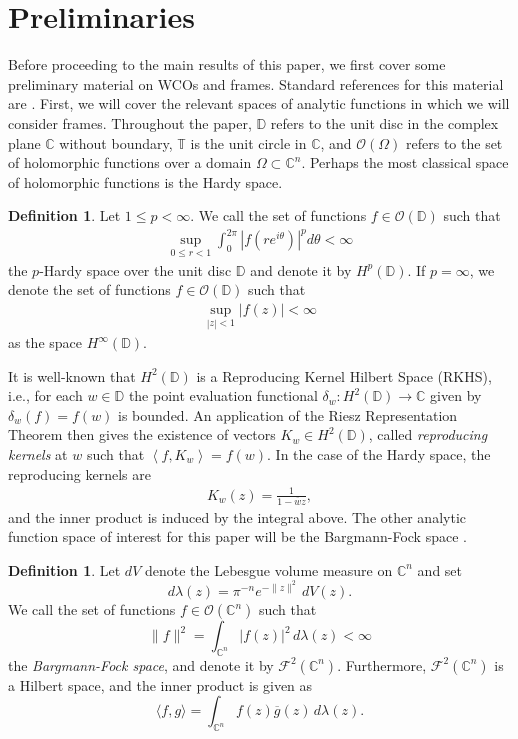 \documentclass{amsart}
\theoremstyle{definition}
\newtheorem{definition}[thm]{Definition}
\theoremstyle{remark}
\numberwithin{equation}{section}
\newcommand{\ip}[2]{\left\langle {#1} , {#2} \right\rangle} %
\begin{document}
\section{Preliminaries}\label{sec:prelim}
Before proceeding to the main results of this paper, we first cover some preliminary material on WCOs and frames. Standard references for this material are \cite{christensen2003introduction,cowen2019composition,shapiro2012composition}. First, we will cover the relevant spaces of analytic functions in which we will consider frames. Throughout the paper, $\mathbb{D}$ refers to the unit disc in the complex plane $\mathbb{C}$ without boundary, $\mathbb{T}$ is the unit circle in $\mathbb{C}$, and $\mathcal{O}(\Omega)$ refers to the set of holomorphic functions over a domain $\Omega\subset\mathbb{C}^{n}$. Perhaps the most classical space of holomorphic functions is the Hardy space.
\begin{definition}\label{def:Hardy}
    Let $1\leq p<\infty$. We call the set of functions $f\in\mathcal{O}(\mathbb{D})$ such that 
    \begin{align*}
        \sup_{0\leq r<1}\int_{0}^{2\pi}\left|f(re^{i\theta})\right|^{p}d\theta<\infty
    \end{align*}
    the $p$-Hardy space over the unit disc $\mathbb{D}$ and denote it by $H^{p}(\mathbb{D})$. If $p=\infty$, we denote the set of functions $f\in\mathcal{O}(\mathbb{D})$ such that 
    \begin{align*}
        \sup_{|z|<1}|f(z)|<\infty
    \end{align*}
    as the space $H^{\infty}(\mathbb{D})$. 
\end{definition}
It is well-known \cite{duren1970theory,paulsen2016introduction} that $H^{2}(\mathbb{D})$ is a Reproducing Kernel Hilbert Space (RKHS), i.e., for each $w\in\mathbb{D}$ the point evaluation functional $\delta_{w}:H^{2}(\mathbb{D})\to\mathbb{C}$ given by $\delta_w(f) = f(w)$ is bounded. An application of the Riesz Representation Theorem \cite{lax2014functional} then gives the existence of vectors $K_{w}\in H^{2}(\mathbb{D})$, called \textit{reproducing kernels} at $w$ such that $\ip{f}{K_{w}}=f(w)$. In the case of the Hardy space, the reproducing kernels are 
\begin{align*}
    K_{w}(z)=\frac{1}{1-\overline{w}z},
\end{align*}
and the inner product is induced by the integral above. The other analytic function space of interest for this paper will be the Bargmann-Fock space \cite{Z12}.
\begin{definition}
Let $dV$ denote the Lebesgue volume measure on $\mathbb{C}^{n}$ and set
\[
  d\lambda(z)=\pi^{-n}e^{-\|z\|^{2}}\,dV(z).
\]
We call the set of functions $f\in\mathcal{O}(\mathbb{C}^{n})$ such that
\[
  \|f\|^{2}=\int_{\mathbb{C}^{n}}|f(z)|^{2}\,d\lambda(z)<\infty
\]
the \emph{Bargmann-Fock space}, and denote it by $\mathcal{F}^{2}(\mathbb{C}^{n})$. Furthermore, $\mathcal{F}^{2}(\mathbb{C}^{n})$ is a Hilbert space, and
the inner product is given as
$$\langle f,g\rangle=\int_{\mathbb{C}^{n}}f(z)\overline{g}(z)\,d\lambda(z).$$
\end{definition}
\end{document}
